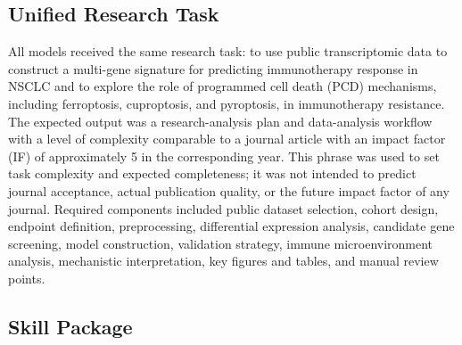\documentclass[11pt]{article}
\begin{document}
\subsection{Unified Research Task}

All models received the same research task: to use public transcriptomic data to construct a multi-gene signature for predicting immunotherapy response in NSCLC and to explore the role of programmed cell death (PCD) mechanisms, including ferroptosis, cuproptosis, and pyroptosis, in immunotherapy resistance. The expected output was a research-analysis plan and data-analysis workflow with a level of complexity comparable to a journal article with an impact factor (IF) of approximately 5 in the corresponding year. This phrase was used to set task complexity and expected completeness; it was not intended to predict journal acceptance, actual publication quality, or the future impact factor of any journal. Required components included public dataset selection, cohort design, endpoint definition, preprocessing, differential expression analysis, candidate gene screening, model construction, validation strategy, immune microenvironment analysis, mechanistic interpretation, key figures and tables, and manual review points.

\subsection{Skill Package}
\end{document}
